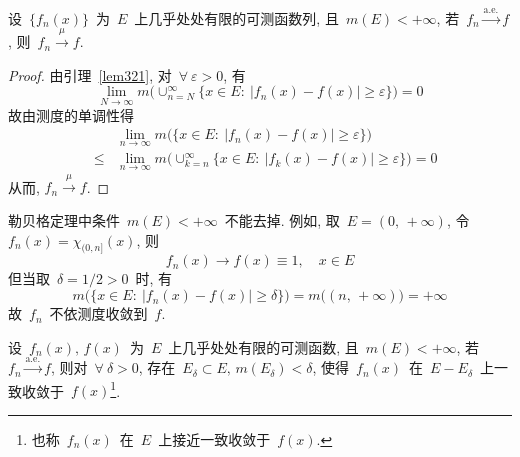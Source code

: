\begin{theorem} \label{prop321}
设~$\{f_n(x)\}$~为~$E$~上几乎处处有限的可测函数列, 且~$m(E) < +\infty$, 若~$f_n \xrightarrow{\mathrm{a.e.}} f$, 则~$f_n \xrightarrow{~\mu~} f$.
\end{theorem}

\begin{proof}
由引理~\ref{lem321}, 对~$\forall~\varepsilon > 0$, 有
\[
\lim_{N \to \infty} m \big( \mathop{\cup}_{n=N}^\infty \big\{ x \in E: \: |f_n(x) - f(x)| \geqslant \varepsilon \big\} \big) = 0
\]
故由测度的单调性得
\begin{eqnarray*}
&& \lim_{n \to \infty} m\big( \{x \in E: \: |f_n(x) - f(x)| \geqslant \varepsilon \}\big) \\
&\leqslant& \lim_{n \to \infty} m \big( \mathop{\cup}_{k=n}^\infty \big\{ x \in E: \: |f_k(x) - f(x)| \geqslant \varepsilon \big\} \big) = 0
\end{eqnarray*}
从而, $f_n \xrightarrow{~\mu~} f$.
\end{proof}

\begin{remark}
勒贝格定理中条件~$m(E)< +\infty$~不能去掉. 例如, 取~$E = (0,\,+\infty)$, 令~$f_n(x) = \chi_{(0,n]}(x)$,
则
\[
f_n(x) \rightarrow f(x) \equiv 1, \quad x \in E
\]
但当取~$\delta = 1/2 >0$~时, 有
\[
m\big( \{x \in E: \: |f_n(x)-f(x)| \geqslant \delta\}\big) = m\big( (n,\, +\infty) \big) = +\infty
\]
故~$f_n$~不依测度收敛到~$f$.
\end{remark}

\begin{theorem}
设~$f_n(x),\,f(x)$~为~$E$~上几乎处处有限的可测函数, 且~$m(E) < +\infty$, 若~$f_n \xrightarrow{\mathrm{a.e.}} f$, 则对~$\forall~\delta > 0$, 存在~$E_\delta \subset E, \, m(E_\delta) < \delta$, 使得~$f_n(x)$~在~$E-E_\delta$~上一致收敛于~$f(x)$\footnote{也称~$f_n(x)$~在~$E$~上接近一致收敛于~$f(x)$.}.
\end{theorem}

